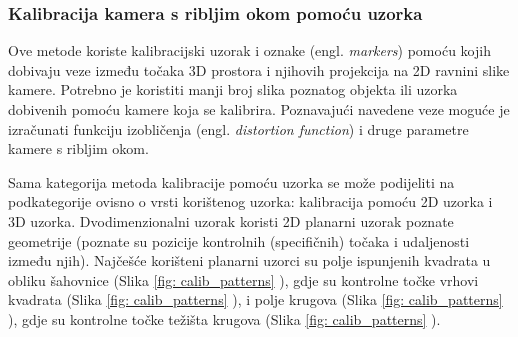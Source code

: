 \documentclass[../seminar.tex]{subfiles}
\begin{document}
\subsubsection{Kalibracija kamera s ribljim okom pomoću uzorka}

Ove metode koriste kalibracijski uzorak i oznake (engl. \textit{markers}) pomoću kojih dobivaju veze između točaka 3D prostora i njihovih projekcija na 2D ravnini slike kamere. Potrebno je koristiti manji broj slika poznatog objekta ili uzorka dobivenih pomoću kamere koja se kalibrira. Poznavajući navedene veze moguće je izračunati funkciju izobličenja (engl. \textit{distortion function}) i druge parametre kamere s ribljim okom. 

Sama kategorija metoda kalibracije pomoću uzorka se može podijeliti na podkategorije ovisno o vrsti korištenog uzorka: kalibracija pomoću 2D uzorka i 3D uzorka. Dvodimenzionalni uzorak koristi 2D planarni uzorak poznate geometrije (poznate su pozicije kontrolnih (specifičnih) točaka i udaljenosti između njih). Najčešće korišteni planarni uzorci su polje ispunjenih kvadrata u obliku šahovnice (Slika \ref{fig: calib_patterns} ), gdje su kontrolne točke vrhovi kvadrata (Slika \ref{fig: calib_patterns} ), i polje krugova (Slika \ref{fig: calib_patterns} ), gdje su kontrolne točke težišta krugova (Slika \ref{fig: calib_patterns} ). 
\end{document}
